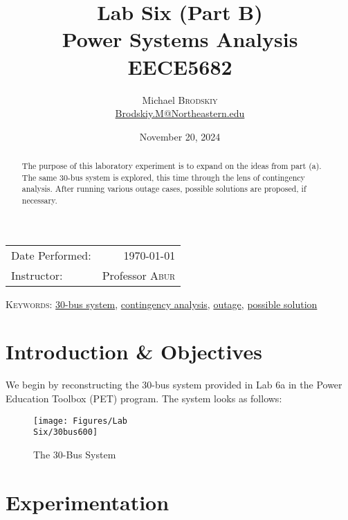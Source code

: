 \documentclass[
	letterpaper, %
	10pt, %
]{CSUniSchoolLabReport}
\title{Lab Six (Part B)\\ Power Systems Analysis \\ EECE5682} %
\author{Michael \textsc{Brodskiy}\\ \small \href{mailto:Brodskiy.M@Northeastern.edu}{Brodskiy.M@Northeastern.edu}}
\date{November 20, 2024} %
\begin{document}
\maketitle %

\begin{center}
	\begin{tabular}{l r}
		Date Performed: & \today \\ %
		Instructor: & Professor \textsc{Abur} \\ %
	\end{tabular}
\end{center}

\newpage

\begin{abstract}

  The purpose of this laboratory experiment is to expand on the ideas from part (a). The same 30-bus system is explored, this time through the lens of contingency analysis. After running various outage cases, possible solutions are proposed, if necessary.

\end{abstract}

\begin{flushleft}

  \textsc{Keywords:} \underline{30-bus system}, \underline{contingency analysis}, \underline{outage}, \underline{possible solution}

\end{flushleft}

\newpage

\section{Introduction \& Objectives}

We begin by reconstructing the 30-bus system provided in Lab 6a in the Power Education Toolbox (PET) program. The system looks as follows:

\begin{figure}[H]
  \centering
  \texttt{[image: Figures/Lab\\ Six/30bus600]}
  \caption{The 30-Bus System}
  \label{fig:1}
\end{figure}

\section{Experimentation}
\end{document}

